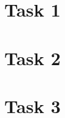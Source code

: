 \documentclass[12pt,a4paper]{article}
\begin{document}
\section*{Task 1}
\section*{Task 2}
  
\section*{Task 3}
  
\end{document}
